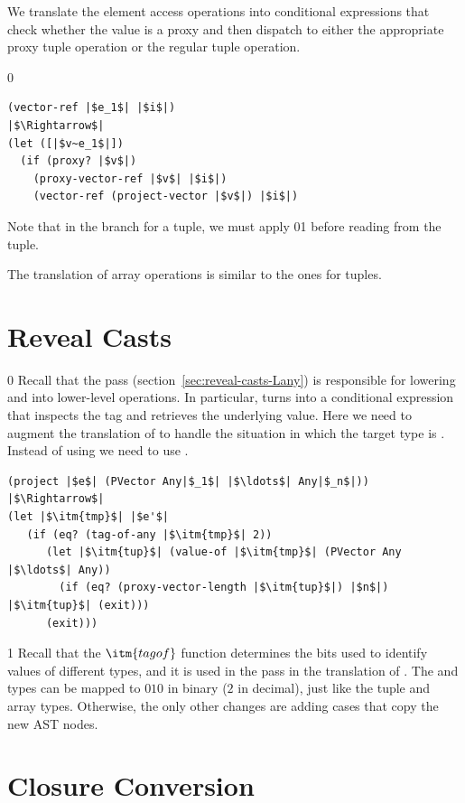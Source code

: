 \documentclass[7x10]{TimesAPriori_MIT}%
\def\racketEd{0}
\def\pythonEd{1}
\providecommand{\BookEdition}{1}
\let\edition\BookEdition
\newcommand{\racket}[1]{{\if\edition\racketEd{#1}\fi}}
\newcommand{\pythonColor}[0]{}
\newcommand{\python}[1]{{\if\edition\pythonEd\pythonColor #1\fi}}
\numberwithin{theorem}{chapter}
\numberwithin{definition}{chapter}
\numberwithin{equation}{chapter}
\begin{document}
We translate the element access operations into conditional
expressions that check whether the value is a proxy and then dispatch
to either the appropriate proxy tuple operation or the regular tuple
operation.
{\if\edition\racketEd    
\begin{lstlisting}
(vector-ref |$e_1$| |$i$|)
|$\Rightarrow$|
(let ([|$v~e_1$|])
  (if (proxy? |$v$|)
    (proxy-vector-ref |$v$| |$i$|)
    (vector-ref (project-vector |$v$|) |$i$|)
\end{lstlisting}
\fi}
%
Note that in the branch for a tuple, we must apply
\racket{}\python{} before reading
from the tuple.

The translation of array operations is similar to the ones for tuples.


\section{Reveal Casts }
\label{sec:reveal-casts-gradual}

{\if\edition\racketEd    
Recall that the  pass
(section~\ref{sec:reveal-casts-Lany}) is responsible for lowering
 and  into lower-level operations.
%
In particular,  turns into a conditional expression that
inspects the tag and retrieves the underlying value.  Here we need to
augment the translation of  to handle the situation in which
the target type is .  Instead of using
 we need to use .
\begin{lstlisting}
(project |$e$| (PVector Any|$_1$| |$\ldots$| Any|$_n$|))
|$\Rightarrow$|
(let |$\itm{tmp}$| |$e'$|
   (if (eq? (tag-of-any |$\itm{tmp}$| 2))
      (let |$\itm{tup}$| (value-of |$\itm{tmp}$| (PVector Any |$\ldots$| Any))
        (if (eq? (proxy-vector-length |$\itm{tup}$|) |$n$|) |$\itm{tup}$| (exit)))
      (exit)))
\end{lstlisting}
\fi}
%
{\if\edition\pythonEd\pythonColor
Recall that the $\itm{tagof}$ function determines the bits used to
identify values of different types, and it is used in the 
pass in the translation of . The \PTUPLETYNAME{} and
\PARRAYTYNAME{} types can be mapped to $010$ in binary ($2$ in
decimal), just like the tuple and array types.
\fi}  
%
Otherwise, the only other changes are adding cases that copy the new AST nodes.

\pagebreak

\section{Closure Conversion }
\label{sec:closure-conversion-gradual}
\end{document}
